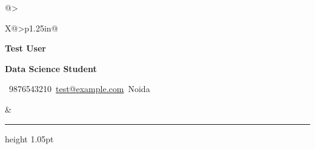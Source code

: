 \documentclass[10pt]{article}
\begin{document}
\noindent
\begin{tabularx}{\textwidth}{@{}>{\raggedright\arraybackslash}X@{}>{\raggedleft\arraybackslash}p{1.25in}@{}}
\begin{minipage}[t]{\linewidth}
\vspace{0pt}
{\fontsize{27}{30}\selectfont\bfseries\color{blacktext} Test User}\par
{\vspace{.01cm}\fontsize{11.5}{13}\selectfont\bfseries\color{muted} Data Science Student}\par
\vspace{.055cm}
{\fontsize{8.4}{10}\selectfont\color{muted} \faPhone\ 9876543210\hspace{.18cm}\faEnvelope\ \href{mailto:test@example.com}{test@example.com}\hspace{.18cm}\faMapMarker*\ Noida}\par


\end{minipage}
&
\begin{minipage}[t]{1.25in}
\vspace{0pt}

\end{minipage}
\end{tabularx}
\vspace{.08cm}\hrule height 1.05pt
\end{document}
